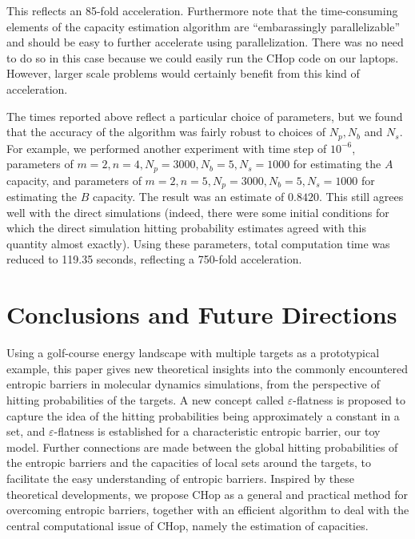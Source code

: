 \documentclass[english, aip, jcp, priprint, graphicx,floatfix]{revtex4-1}
\theoremstyle{plain}
\theoremstyle{definition}
\theoremstyle{plain}
\begin{document}
This reflects an 85-fold acceleration.  Furthermore note that the time-consuming elements of the capacity estimation algorithm are ``embarassingly parallelizable'' and should be easy to further accelerate using parallelization.  There was no need to do so in this case because we could easily run the CHop code on our laptops.  However, larger scale problems would certainly benefit from this kind of acceleration.  

The times reported above reflect a particular choice of parameters, but we found that the accuracy of the algorithm was fairly robust to choices of $N_p, N_b$ and $N_s$.  For example, we performed another experiment with time step of $10^{-6}$, parameters of $ m = 2, n = 4, N_p = 3000, N_b = 5, N_s = 1000 $ for estimating the $A$ capacity, and parameters of $ m = 2, n = 5, N_p = 3000, N_b = 5, N_s = 1000 $ for estimating the $B$ capacity.  The result was an estimate of $0.8420$. This still agrees well with the direct simulations (indeed, there were some initial conditions for which the direct simulation hitting probability estimates agreed with this quantity almost exactly).  Using these parameters, total computation time was reduced to 119.35 seconds, reflecting a 750-fold acceleration.

\section{Conclusions and Future Directions}\label{sec:conclusion}

Using a golf-course energy landscape with multiple targets as a prototypical example, this paper gives new theoretical insights into the commonly encountered entropic barriers in molecular dynamics simulations, from the perspective of hitting probabilities of the targets. A new concept called $\varepsilon$-flatness is proposed to capture the idea of the hitting probabilities being approximately a constant in a set, and $\varepsilon$-flatness is established for a characteristic entropic barrier, our toy model. Further connections are made between the global hitting probabilities of the entropic barriers and the capacities of local sets around the targets, to facilitate the easy understanding of entropic barriers. Inspired by these theoretical developments, we propose CHop as a general and practical method for overcoming entropic barriers, together with an efficient algorithm to deal with the central computational issue of CHop, namely the estimation of capacities.
\end{document}

